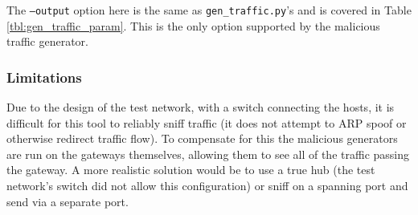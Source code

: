 \par The \texttt{--output} option here is the same as \texttt{gen\_traffic.py}'s and is covered in Table \ref{tbl:gen_traffic_param}. This is the only option supported by the malicious traffic generator.

\subsubsection{Limitations}
\par Due to the design of the test network, with a switch connecting the hosts, it is difficult for this tool to reliably sniff traffic (it does not attempt to \ac{ARP} spoof or otherwise redirect traffic flow). To compensate for this the malicious generators are run on the gateways themselves, allowing them to see all of the traffic passing the gateway. A more realistic solution would be to use a true hub (the test network's switch did not allow this configuration) or sniff on a spanning port and send via a separate port.

